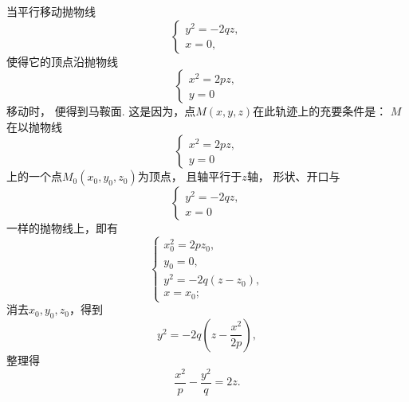 \begin{enumerate}
	当平行移动抛物线\[
		\left\{ \begin{array}{l}
			y^2 = -2qz, \\
			x = 0,
		\end{array} \right.
	\]
	使得它的顶点沿抛物线\[
		\left\{ \begin{array}{l}
			x^2 = 2pz, \\
			y = 0
		\end{array} \right.
	\]移动时，
	便得到马鞍面.
	这是因为，点\(M(x,y,z)\)在此轨迹上的充要条件是：
	\(M\)在以抛物线\[
		\left\{ \begin{array}{l}
			x^2 = 2pz, \\
			y = 0
		\end{array} \right.
	\]上的一个点\(M_0(x_0,y_0,z_0)\)为顶点，
	且轴平行于\(z\)轴，
	形状、开口与\[
		\left\{ \begin{array}{l}
			y^2 = -2qz, \\
			x = 0
		\end{array} \right.
	\]一样的抛物线上，即有\[
		\left\{ \begin{array}{l}
			x_0^2 = 2pz_0, \\
			y_0 = 0, \\
			y^2 = -2q(z-z_0), \\
			x = x_0;
		\end{array} \right.
	\]
	消去\(x_0,y_0,z_0\)，得到\[
		y^2=-2q\left(z - \frac{x^2}{2p}\right),
	\]
	整理得\[
		\frac{x^2}{p} - \frac{y^2}{q} = 2z.
	\]
\end{enumerate}

